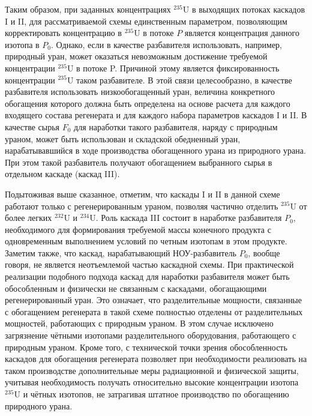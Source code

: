 Таким образом, при заданных концентрациях $^{235}$U в выходящих потоках каскадов I и II, для рассматриваемой схемы единственным параметром, позволяющим корректировать концентрацию в $^{235}$U в потоке $P$ является концентрация данного изотопа в $P_{0}$. Однако, если в качестве разбавителя использовать, например, природный уран, может оказаться невозможным достижение требуемой концентрации $^{235}$U в потоке P. Причиной этому является фиксированность концентрации $^{235}$U таком разбавителе. В этой связи целесообразно, в качестве разбавителя использовать низкообогащенный уран, величина конкретного обогащения которого должна быть определена на основе расчета для каждого входящего состава регенерата и для каждого набора параметров каскадов I и II. В качестве сырья $F_0$ для наработки такого разбавителя, наряду с природным ураном, может быть использован и складской обедненный уран, нарабатывавшийся в ходе производства обогащенного урана из природного урана. При этом такой разбавитель получают обогащением выбранного сырья в отдельном каскаде (каскад III).

Подытоживая выше сказанное, отметим, что каскады I и II в данной схеме работают только с регенерированным ураном, позволяя частично отделить $^{235}$U от более легких $^{232}$U и $^{234}$U. Роль каскада III состоит в наработке разбавителя $P_{0}$, необходимого для формирования требуемой массы конечного продукта с одновременным выполнением условий по четным изотопам в этом продукте. Заметим также, что каскад, нарабатывающий НОУ-разбавитель $P_{0}$, вообще говоря, не является неотъемлемой частью каскадной схемы. При практической реализации подобного подхода каскад для наработки разбавителя может быть обособленным и физически не связанным с каскадами, обогащающими регенерированный уран. Это означает, что разделительные мощности, связанные с обогащением регенерата в такой схеме полностью отделены от разделительных мощностей, работающих с природным ураном. В этом случае исключено загрязнение чётными изотопами разделительного оборудования, работающего с природным ураном. Кроме того, с технической точки зрения обособленность каскадов для обогащения регенерата позволяет при необходимости реализовать на таком производстве дополнительные меры радиационной и физической защиты, учитывая необходимость получать относительно высокие концентрации изотопа $^{235}$U и чётных изотопов, не затрагивая штатное производство по обогащению природного урана.

